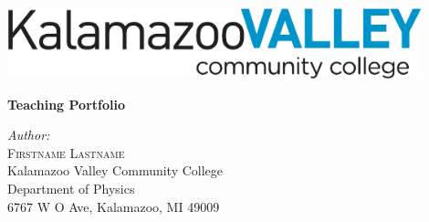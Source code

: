 \documentclass[twoside,11pt]{report}
\begin{document}
\begin{titlepage}
\begin{center}
\includegraphics[width=0.9\textwidth]{KVCClogo}

\vspace*{3cm}
{ \Huge \bfseries Teaching Portfolio }
\vspace{1.5cm}

\vspace{1.5cm}
{\large \emph{Author:}\\}
{\LARGE \textsc{Firstname Lastname}\\}
\vspace{0.4cm}
{\large Kalamazoo Valley Community College}\\
\vspace{0.2cm}
{\large Department of Physics}\\
\vspace{0.2cm}
{\large 6767 W O Ave, Kalamazoo, MI 49009}\\

\end{center}
\end{titlepage}

\leavevmode\thispagestyle{empty}\newpage
\label{tableofcontents}\tableofcontents
\clearpage
\renewcommand\thechapter{\arabic{chapter}}
\renewcommand{\chaptermark}[1]{\markboth{Part \thechapter: \quad #1}{}}




\setcounter{chapter}{0}
\renewcommand\thechapter{\Alph{chapter}}
\renewcommand{\chaptermark}[1]{\markboth{Section \thechapter: \quad #1}{}}













\renewcommand\thechapter{\arabic{chapter}}
\renewcommand{\chaptermark}[1]{\markboth{Part \thechapter: \quad #1}{}}
\setcounter{chapter}{2}



\end{document}
